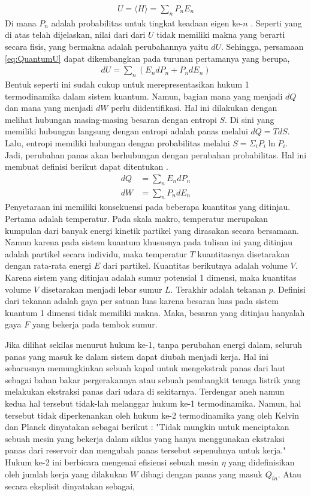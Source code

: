 \begin{align}
    U = \langle H \rangle = \sum_n P_n E_n \label{eq:QuantumU}
\end{align}
Di mana \(P_n\) adalah probabilitas untuk tingkat keadaan eigen ke-\(n\) \cite{Strasberg2021First}. Seperti yang di atas telah dijelaskan, nilai dari dari \(U\) tidak memiliki makna yang berarti secara fisis, yang bermakna adalah perubahannya yaitu \(dU\). Sehingga, persamaan \ref{eq:QuantumU} dapat dikembangkan pada turunan pertamanya yang berupa,
\begin{align}
    dU = \sum_n (E_ndP_n + P_ndE_n)
\end{align}
Bentuk seperti ini sudah cukup untuk merepresentasikan hukum 1 termodinamika dalam sistem kuantum. Namun, bagian mana yang menjadi \(dQ\) dan mana yang menjadi \(dW\) perlu diidentifikasi. Hal ini dilakukan dengan melihat hubungan masing-masing besaran dengan entropi \(S\). Di sini yang memiliki hubungan langsung dengan entropi adalah panas melalui \(dQ = TdS\). Lalu, entropi memiliki hubungan dengan probabilitas melalui \(S = \Sigma_iP_i\ln{P_i}\). Jadi, perubahan panas akan berhubungan dengan perubahan probabilitas. Hal ini membuat definisi berikut dapat ditentukan \cite{Dann2023Unification}.
\begin{align}
    dQ &= \sum_n E_ndP_n \\
    dW &= \sum_n P_ndE_n
\end{align}
Penyetaraan ini memiliki konsekuensi pada beberapa kuantitas yang ditinjau. Pertama adalah temperatur. Pada skala makro, temperatur merupakan kumpulan dari banyak energi kinetik partikel yang dirasakan secara bersamaan. Namun karena pada sistem kuantum khususnya pada tulisan ini yang ditinjau adalah partikel secara individu, maka temperatur \(T\) kuantitasnya disetarakan dengan rata-rata energi \(E\) dari partikel. Kuantitas berikutnya adalah volume \(V\). Karena sistem yang ditinjau adalah sumur potensial 1 dimensi, maka kuantitas volume \(V\) disetarakan menjadi lebar sumur \(L\). Terakhir adalah tekanan \(p\). Definisi dari tekanan adalah gaya per satuan luas karena besaran luas pada sistem kuantum 1 dimensi tidak memiliki makna. Maka, besaran yang ditinjau hanyalah gaya \(F\) yang bekerja pada tembok sumur. \cite{Quan2008QHE}
\par Jika dilihat sekilas menurut hukum ke-1, tanpa perubahan energi dalam, seluruh panas yang masuk ke dalam sistem dapat diubah menjadi kerja. Hal ini seharusnya memungkinkan sebuah kapal untuk mengekstrak panas dari laut sebagai bahan bakar pergerakannya atau sebuah pembangkit tenaga listrik yang melakukan ekstraksi panas dari udara di sekitarnya. Terdengar aneh namun kedua hal tersebut tidak-lah melanggar hukum ke-1 termodinamika. Namun, hal tersebut tidak diperkenankan oleh hukum ke-2 termodinamika yang oleh Kelvin dan Planck dinyatakan sebagai berikut \cite{Dinccer2012Thermodynamic}: "Tidak mungkin untuk menciptakan sebuah mesin yang bekerja dalam siklus yang hanya menggunakan ekstraksi panas dari reservoir dan mengubah panas tersebut sepenuhnya untuk kerja." Hukum ke-2 ini berbicara mengenai efisiensi sebuah mesin \(\eta\) yang didefinisikan oleh jumlah kerja yang dilakukan \(W\) dibagi dengan panas yang masuk \(Q_{in}\). Atau secara eksplisit dinyatakan sebagai,
